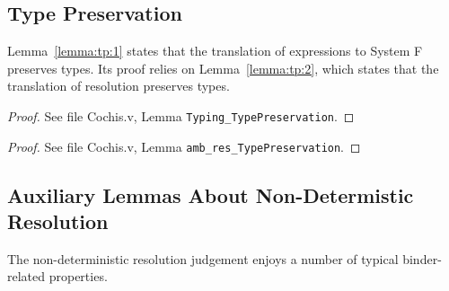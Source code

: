 \subsection{Type Preservation}\label{proof:preservation}

Lemma~\ref{lemma:tp:1} states that the translation of expressions to System F preserves
types. Its proof relies on Lemma~\ref{lemma:tp:2}, which states that the translation
of resolution preserves types.

{\centering
{}}
\begin{proof}
	See file Cochis.v, Lemma \texttt{Typing\_TypePreservation}.
\end{proof}

{\centering
{}}
\begin{proof}
	See file Cochis.v, Lemma \texttt{amb\_res\_TypePreservation}.
\end{proof}

\subsection{Auxiliary Lemmas About Non-Determistic Resolution}

The non-deterministic resolution judgement enjoys a number of
typical binder-related properties.

